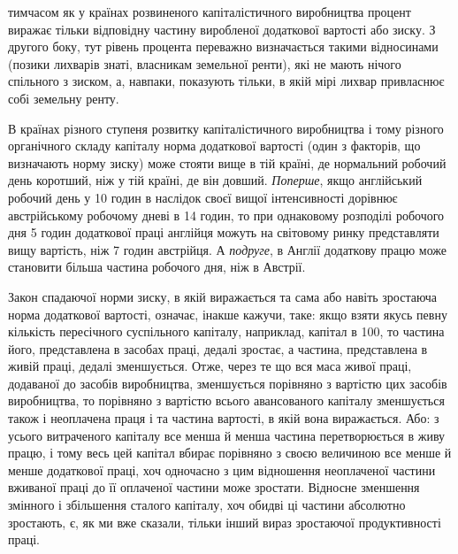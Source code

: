 \parcont{}  %
тимчасом як у країнах розвиненого капіталістичного виробництва
процент виражає тільки відповідну частину виробленої додаткової
вартості або зиску. З другого боку, тут рівень процента переважно
визначається такими відносинами (позики лихварів знаті,
власникам земельної ренти), які не мають нічого спільного з
зиском, а, навпаки, показують тільки, в якій мірі лихвар привласнює
собі земельну ренту.

В країнах різного ступеня розвитку капіталістичного виробництва
і тому різного органічного складу капіталу норма
додаткової вартості (один з факторів, що визначають норму зиску)
може стояти вище в тій країні, де нормальний робочий день
коротший, ніж у тій країні, де він довший. \emph{Поперше}, якщо
англійський робочий день у 10 годин в наслідок своєї вищої
інтенсивності дорівнює австрійському робочому дневі в 14 годин,
то при однаковому розподілі робочого дня 5 годин додаткової
праці англійця можуть на світовому ринку представляти
вищу вартість, ніж 7 годин австрійця. А \emph{подруге}, в Англії
додаткову працю може становити більша частина робочого дня,
ніж в Австрії.

Закон спадаючої норми зиску, в якій виражається та сама або
навіть зростаюча норма додаткової вартості, означає, інакше
кажучи, таке: якщо взяти якусь певну кількість пересічного
суспільного капіталу, наприклад, капітал в 100, то частина
його, представлена в засобах праці, дедалі зростає, а частина,
представлена в живій праці, дедалі зменшується. Отже, через
те що вся маса живої праці, додаваної до засобів виробництва,
зменшується порівняно з вартістю цих засобів виробництва,
то порівняно з вартістю всього авансованого капіталу
зменшується також і неоплачена праця і та частина вартості,
в якій вона виражається. Або: з усього витраченого капіталу
все менша й менша частина перетворюється в живу працю,
і тому весь цей капітал вбирає порівняно з своєю величиною
все менше й менше додаткової праці, хоч одночасно з цим відношення
неоплаченої частини вживаної праці до її оплаченої частини
може зростати. Відносне зменшення змінного і збільшення
сталого капіталу, хоч обидві ці частини абсолютно зростають,
є, як ми вже сказали, тільки інший вираз зростаючої продуктивності
праці.

